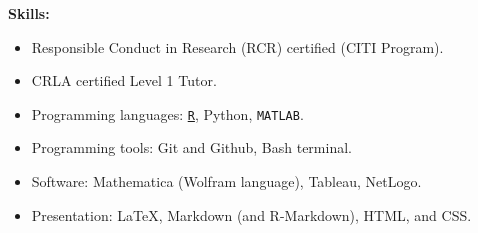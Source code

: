 \textbf{Skills:}

\begin{itemize}[noitemsep]
\item Responsible Conduct in Research (RCR) certified (CITI Program).
\item CRLA certified Level 1 Tutor.
\item Programming languages: \ul{\texttt{R}}, Python, \texttt{MATLAB}.
\item Programming tools: Git and Github, Bash terminal.
\item Software: Mathematica (Wolfram language), Tableau, NetLogo.
\item Presentation: \LaTeX{}, Markdown (and R-Markdown), HTML, and CSS.
\end{itemize}
